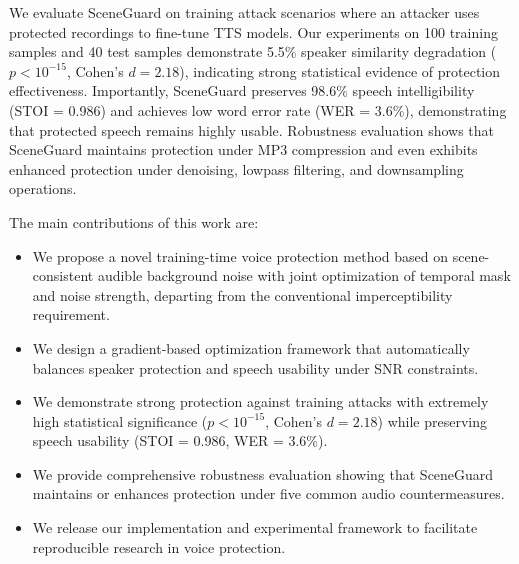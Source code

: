 We evaluate SceneGuard on training attack scenarios where an attacker uses protected recordings to fine-tune TTS models. Our experiments on 100 training samples and 40 test samples demonstrate 5.5\% speaker similarity degradation ($p < 10^{-15}$, Cohen's $d = 2.18$), indicating strong statistical evidence of protection effectiveness. Importantly, SceneGuard preserves 98.6\% speech intelligibility (STOI = 0.986) and achieves low word error rate (WER = 3.6\%), demonstrating that protected speech remains highly usable. Robustness evaluation shows that SceneGuard maintains protection under MP3 compression and even exhibits enhanced protection under denoising, lowpass filtering, and downsampling operations.

The main contributions of this work are:
\begin{itemize}
    \item We propose a novel training-time voice protection method based on scene-consistent audible background noise with joint optimization of temporal mask and noise strength, departing from the conventional imperceptibility requirement.
    \item We design a gradient-based optimization framework that automatically balances speaker protection and speech usability under SNR constraints.
    \item We demonstrate strong protection against training attacks with extremely high statistical significance ($p < 10^{-15}$, Cohen's $d = 2.18$) while preserving speech usability (STOI = 0.986, WER = 3.6\%).
    \item We provide comprehensive robustness evaluation showing that SceneGuard maintains or enhances protection under five common audio countermeasures.
    \item We release our implementation and experimental framework to facilitate reproducible research in voice protection.
\end{itemize}

